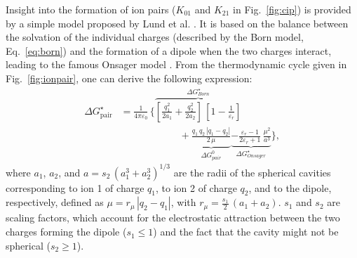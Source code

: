 \documentclass[review,preprint]{elsarticle}
\begin{document}
Insight into the formation of ion pairs ($K_{01}$ and $K_{21}$ in Fig.~\ref{fig:cip}) is provided by a simple model proposed by Lund et al. \cite{lundDielectricInterpretationSpecificity2010}. It is based on the balance between the solvation of the individual charges (described by the Born model, Eq.~\eqref{eq:born}) and the formation of a dipole when the two charges interact, leading to the famous Onsager model \cite{onsagerElectricMomentsMolecules1936,krishtalikElectrostaticIonSolvent1991,aubretUnderstandingLocalField2019}. From the thermodynamic cycle given in Fig.~\ref{fig:ionpair}, one can derive the following expression: \begin{align}
	\Delta G_{\text{pair}}^\star &= \frac{1}{4\pi\varepsilon_0}\,\bigg\{\overbrace{\left[\frac{q_1^2}{2a_1}+\frac{q_2^2}{2a_2}\right]\,\left[1-\frac{1}{\varepsilon_r}\right]}^{\Delta G^\star_{Born}}\nonumber\\
	&\hspace{6em}+\underbrace{\frac{q_1\,q_2\,|q_1-q_2|}{2\,\mu}}_{\Delta G^0_{pair}}\underbrace{-\frac{\varepsilon_r-1}{2\varepsilon_r+1}\,\frac{\mu^2}{a^3}}_{\Delta G^\star_{Onsager}}\bigg\},\label{eq:pair}
\end{align}
where $a_1$, $a_2$, and $a=s_2\,( a_1^3+a_2^3)^{1/3}$ are the radii of the spherical cavities corresponding to ion 1 of charge $q_1$, to ion 2 of charge $q_2$, and to the dipole, respectively, defined as $\mu = r_\mu\,|q_2-q_1|$, with $r_\mu= \frac{s_1}{2}\,(a_1+a_2)$.  $s_1$ and $s_2$ are scaling factors, which account for the electrostatic attraction between the two charges forming the dipole ($s_1\leq 1$) and the fact that the cavity might not be spherical ($s_2\geq 1$).
\end{document}

